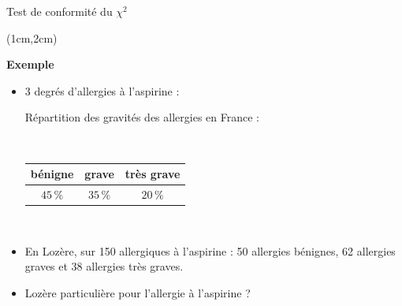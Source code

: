 \documentclass{beamer}
\begin{document}
\begin{frame}{Test de conformité du $\chi^2$}
\begin{textblock*}{\textwidth}(1cm,2cm)

\begin{center}{\bf \Large Exemple \\} \end{center}


\begin{itemize}
\item 3 degrés d'allergies  à l'aspirine : 

Répartition des gravités des allergies en France : 

\

\begin{center}
\begin{tabular}{|c|c|c|}
\hline
bénigne & grave & tr\`es grave \\
\hline
$45\,\%$ & $35\,\%$ & $20\,\%$\\
\hline
\end{tabular}
\end{center}

\

\item  En Lozère,  sur  150  allergiques à 
l'aspirine  : 50  allergies bénignes, 62  allergies graves et
38  allergies très graves.
\item  Lozère particulière pour l'allergie à l'aspirine ?
\end{itemize}

\end{textblock*}

\end{frame}

\end{document}
